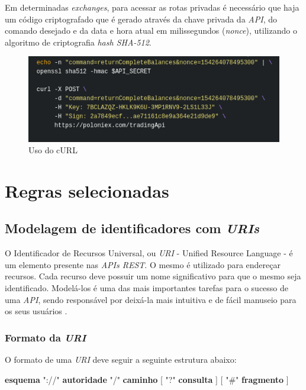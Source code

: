 Em determinadas \textit{exchanges}, para acessar as rotas privadas é necessário que haja um código criptografado que é gerado através da chave privada da \textit{API}, do comando desejado e da data e hora atual em milissegundos (\textit{nonce}), utilizando o algoritmo de criptografia \textit{hash SHA-512}.   
\begin{figure}[h]
	\centering
	\includegraphics[width=\textwidth]{imagens/curl1.png}
	\caption{Uso do cURL}
	\label{fig:google}
\end{figure}

\section{Regras selecionadas}

\subsection{Modelagem de identificadores com \textit{URIs}}

O Identificador de Recursos Universal, ou \textit{URI} - Unified Resource Language - é um elemento presente nas \textit{APIs REST}. O mesmo é utilizado para endereçar recursos. Cada recurso deve possuir um nome significativo para que o mesmo seja identificado.
Modelá-los é uma das mais importantes tarefas para o sucesso de uma \textit{API}, sendo responsável por deixá-la mais intuitiva e de fácil manuseio para os seus usuários \cite{De2017}.

\subsubsection{Formato da \textit{URI}}

O formato de uma \textit{URI} deve seguir a seguinte estrutura abaixo:

\centerline{\textbf{esquema} "://" \textbf{autoridade} "/" \textbf{caminho} [ "?" \textbf{consulta} ] [ "\#" \textbf{fragmento} ]}

